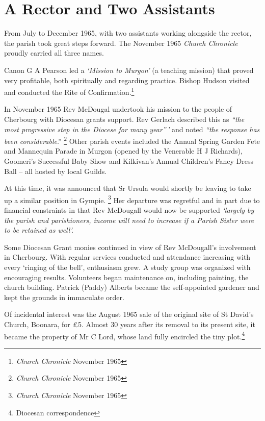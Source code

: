 \section{A Rector and Two Assistants}



From July to December 1965, with two assistants working alongside the rector, the parish took great steps forward. The November 1965 \emph{Church Chronicle} proudly carried all three names.



Canon G A Pearson led a \emph{`Mission to Murgon'} (a teaching mission) that proved very profitable, both spiritually and regarding practice. Bishop Hudson visited and conducted the Rite of Confirmation.\footnote{\emph{Church Chronicle} November 1965}


In November 1965 Rev McDougal undertook his mission to the people of Cherbourg with Diocesan grants support. Rev Gerlach described this as \emph{``the most progressive step in the Diocese for many year''\,'} and noted \emph{``the response has been considerable}.'' \footnote{\emph{Church Chronicle} November 1965} Other parish events included the Annual Spring Garden Fete and Mannequin Parade in Murgon (opened by the Venerable H J Richards), Goomeri's Successful Baby Show and Kilkivan's Annual Children's Fancy Dress Ball -- all hosted by local Guilds.


At this time, it was announced that Sr Ursula would shortly be leaving to take up a similar position in Gympie. \footnote{\emph{Church Chronicle} November 1965} Her departure was regretful and in part due to financial constraints in that Rev McDougall would now be supported \emph{`largely by the parish and parishioners, income will need to increase if a Parish Sister were to be retained as well'.}


Some Diocesan Grant monies continued in view of Rev McDougall's involvement in Cherbourg. With regular services conducted and attendance increasing with every `ringing of the bell', enthusiasm grew. A study group was organized with encouraging results. Volunteers began maintenance on, including painting, the church building. Patrick (Paddy) Alberts became the self-appointed gardener and kept the grounds in immaculate order.



Of incidental interest was the August 1965 sale of the original site of St David's Church, Boonara, for \pounds5. Almost 30 years after its removal to its present site, it became the property of Mr C Lord, whose land fully encircled the tiny plot.\footnote{Diocesan correspondence}


